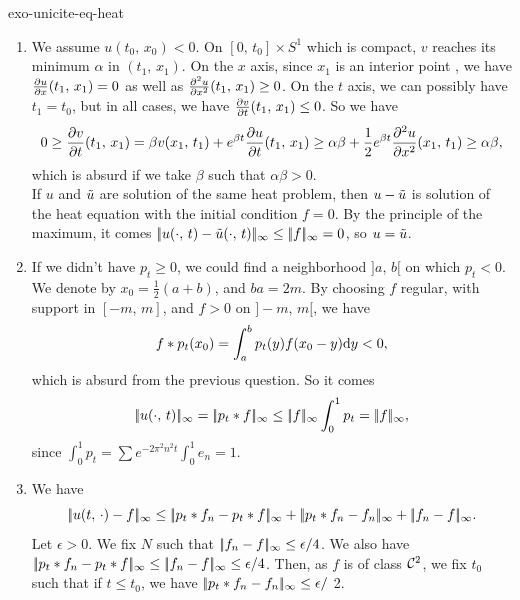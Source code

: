 \begin{correction}{exo-unicite-eq-heat}
\begin{enumerate}
\item We assume $ u (t_0, \, x_0) <0 $. On $ [0, \, t_0] \times S^1 $ which is compact, $ v $ reaches its minimum $ \alpha $ in $ (t_1, \, x_1) $. On the $ x $ axis, since $ x_1 $ is an interior point , we have $ \frac{ \partial u}{\partial x} (t_1, \, x_1) = 0 $ as well as $ \frac{ \partial^2 u}{\partial x^2} (t_1, \, x_1) \geq 0 $. On the $ t $ axis, we can possibly have $ t_1 = t_0 $, but in all cases, we have $ \frac{ \partial v}{\partial t} (t_1, \, x_1) \leq 0 $. So we have
\begin{equation*}
0 \geq \frac{ \partial v}{\partial t} (t_1, \, x_1) = \beta v (x_1, \, t_1) + e^{\beta t} \frac{ \partial u}{\partial t} (t_1, \, x_1) \geq \alpha \beta + \frac{1}{2} e^{\beta t} \frac{ \partial^2 u}{\partial x^2} (x_1, \, t_1) \geq \alpha \beta,
\end{equation*}
which is absurd if we take $ \beta $ such that $ \alpha \beta> 0 $. \\If $ u $ and $ \tilde{u} $ are solution of the same heat problem, then $ u - \tilde{u} $ is solution of the heat equation with the initial condition $ f = 0 $. By the principle of the maximum, it comes $ |\!| u (\cdot, \, t) - \tilde{u} (\cdot, \, t) |\!|_\infty \leq |\!| f |\!|_\infty = 0 $, so $ u = \tilde{u} $.
\item If we didn't have $ p_t \geq 0 $, we could find a neighborhood $] a, \, b [$ on which $ p_t <0 $. We denote by $ x_0 = \frac{1}{2} (a + b) $, and $ ba = 2 m $. By choosing $ f $ regular, with support in $ [- m, \, m] $, and $ f> 0 $ on $] - m, \, m [$, we have
\begin{equation*}
f * p_t (x_0) = \int_a^b{p_t (y) f(x_0-y) \mathrm{d} y} <0,
\end{equation*}
which is absurd from the previous question. So it comes
\begin{equation*}
\norm{u (\cdot, \, t)}_\infty = \norm{p_t * f}_\infty \leq \norm{f}_\infty \int_0^1{p_t} = \norm{f}_\infty,
\end{equation*}
since $ \int_0^1{p_t} = \sum{e^{- 2 \pi^2 n^2 t} \int_0^1{e_n}} = 1 $.
\item We have
\begin{equation*}
\norm{u (t, \, \cdot) - f}_{\infty} \leq \norm{p_t * f_n - p_t * f}_{\infty} + \norm{p_t * f_n - f_n}_{\infty} + \norm{f_n - f}_{\infty}.
\end{equation*}
Let $ \epsilon> 0 $. We fix $ N $ such that $ |\!| f_n - f |\!|_{\infty} \leq \epsilon/4 $. We also have $ |\!| p_t * f_n - p_t * f |\!|_{\infty} \leq |\!| f_n - f |\!|_{\infty} \leq \epsilon/4 $. Then, as $ f $ is of class $ \mathcal{C}^2 $, we fix $ t_0 $ such that if $ t \leq t_0 $, we have $ |\!| p_t * f_n - f_n |\!|_{\infty} \leq \epsilon/$ 2.
\end{enumerate}
\end{correction}
 
